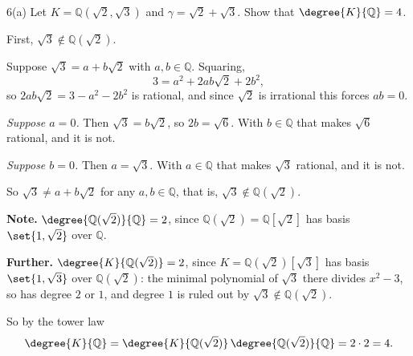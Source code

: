 \documentclass[11pt]{article}
\begin{document}
\begin{problem}{6(a)}
  Let $K = \mathbb{Q}(\sqrt{2},\sqrt{3})$ and $\gamma = \sqrt{2} + \sqrt{3}$.
  Show that $\degree{K}{\mathbb{Q}} = 4$.
\end{problem}

\begin{solution}
  First, $\sqrt{3} \notin \mathbb{Q}(\sqrt{2})$.

  Suppose $\sqrt{3} = a + b\sqrt{2}$ with $a, b \in \mathbb{Q}$. Squaring,
  \[
    3 = a^{2} + 2ab\sqrt{2} + 2b^{2},
  \]
  so $2ab\sqrt{2} = 3 - a^{2} - 2b^{2}$ is rational, and since $\sqrt{2}$ is
  irrational this forces $ab = 0$.

  \emph{Suppose $a = 0$.} Then $\sqrt{3} = b\sqrt{2}$, so $2b = \sqrt{6}$. With
  $b \in \mathbb{Q}$ that makes $\sqrt{6}$ rational, and it is not.

  \emph{Suppose $b = 0$.} Then $a = \sqrt{3}$. With $a \in \mathbb{Q}$ that
  makes $\sqrt{3}$ rational, and it is not.

  So $\sqrt{3} \neq a + b\sqrt{2}$ for any $a, b \in \mathbb{Q}$, that is,
  $\sqrt{3} \notin \mathbb{Q}(\sqrt{2})$.

  \medskip
  \textbf{Note.} $\degree{\mathbb{Q}(\sqrt{2})}{\mathbb{Q}} = 2$, since
  $\mathbb{Q}(\sqrt{2}) = \mathbb{Q}[\sqrt{2}]$ has basis $\set{1, \sqrt{2}}$
  over $\mathbb{Q}$.

  \medskip
  \textbf{Further.} $\degree{K}{\mathbb{Q}(\sqrt{2})} = 2$, since
  $K = \mathbb{Q}(\sqrt{2})[\sqrt{3}]$ has basis $\set{1, \sqrt{3}}$ over
  $\mathbb{Q}(\sqrt{2})$: the minimal polynomial of $\sqrt{3}$ there divides
  $x^{2} - 3$, so has degree $2$ or $1$, and degree $1$ is ruled out by
  $\sqrt{3} \notin \mathbb{Q}(\sqrt{2})$.

  \medskip
  So by the tower law
  \[
    \degree{K}{\mathbb{Q}}
      = \degree{K}{\mathbb{Q}(\sqrt{2})}\,
        \degree{\mathbb{Q}(\sqrt{2})}{\mathbb{Q}}
      = 2 \cdot 2 = 4 .
  \]
\end{solution}
\end{document}
